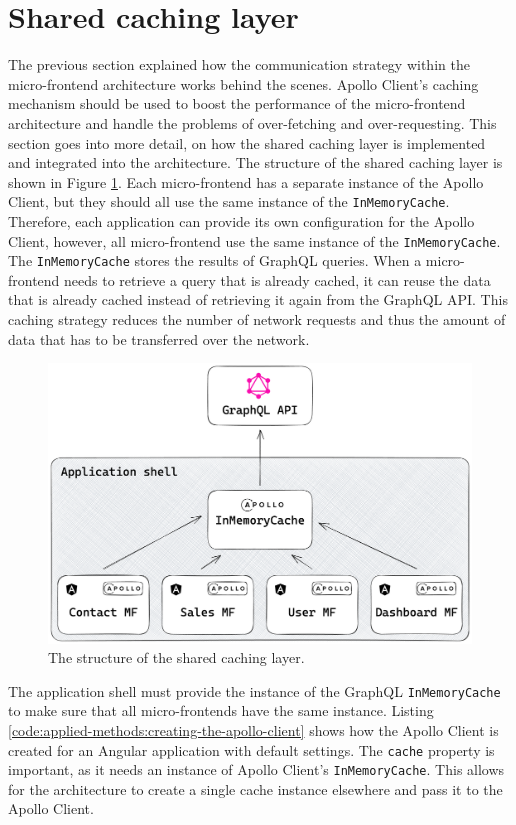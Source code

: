 \section{Shared caching layer}\label{section:applied-methods:shared-caching-layer}

The previous section explained how the communication strategy within the micro-frontend architecture works behind the scenes. Apollo Client's caching mechanism should be used to boost the performance of the micro-frontend architecture and handle the problems of over-fetching and over-requesting. This section goes into more detail, on how the shared caching layer is implemented and integrated into the architecture. The structure of the shared caching layer is shown in Figure \ref{fig:applied-methods:structure-shared-caching-layer}. Each micro-frontend has a separate instance of the Apollo Client, but they should all use the same instance of the \texttt{InMemoryCache}. Therefore, each application can provide its own configuration for the Apollo Client, however, all micro-frontend use the same instance of the \texttt{InMemoryCache}. The \texttt{InMemoryCache} stores the results of GraphQL queries. When a micro-frontend needs to retrieve a query that is already cached, it can reuse the data that is already cached instead of retrieving it again from the GraphQL \ac{API}. This caching strategy reduces the number of network requests and thus the amount of data that has to be transferred over the network.

\ifshowImages
\begin{figure}[H]
  \centering
  \includegraphics[width=0.75\linewidth]{images/applied-methods/shared-caching-layer/shared-caching-layer.png}
  \caption{The structure of the shared caching layer.}\label{fig:applied-methods:structure-shared-caching-layer}
\end{figure}
\fi

\noindent The application shell must provide the instance of the GraphQL \texttt{InMemoryCache} to make sure that all micro-frontends have the same instance. Listing \ref{code:applied-methods:creating-the-apollo-client} shows how the Apollo Client is created for an Angular application with default settings. The \texttt{cache} property is important, as it needs an instance of Apollo Client's \texttt{InMemoryCache}. This allows for the architecture to create a single cache instance elsewhere and pass it to the Apollo Client. 

